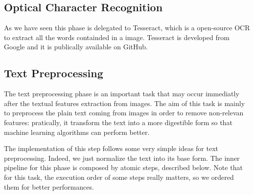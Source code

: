 \documentclass[10pt,twocolumn,letterpaper]{article}
\begin{document}
\subsection{Optical Character Recognition}

As we have seen this phase is delegated to Tesseract, which is a
open-source OCR to extract all the words containded in a
image. Tesseract is developed from Google and it is publically
available on GitHub.

\subsection{Text Preprocessing}

The text preprocessing phase is an important task that may occur
immediatly after the textual features extraction from images. The aim
of this task is mainly to preprocess the plain text coming from images
in order to remove non-relevan features: pratically, it transform the
text into a more digestible form so that machine learning algorithms
can perform better.

The implementation of this step follows some very simple ideas for
text preprocessing. Indeed, we just normalize the text into its base
form. The inner pipeline for this phase is composed by atomic steps,
described below. Note that for this task, the execution order of some
steps really matters, so we ordered them for better performances.
\end{document}
